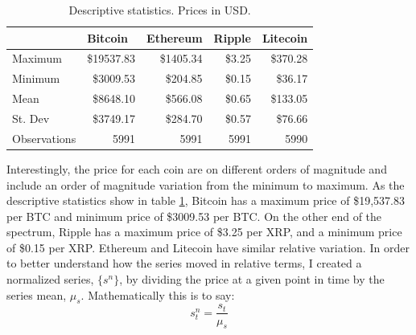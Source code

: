 \documentclass{article}
\begin{document}
	\begin{table}[H]
		\centering
		\begin{tabular}{|l|r|r|r|r|}
			\hline
			& \multicolumn{1}{l|}{Bitcoin} & \multicolumn{1}{l|}{Ethereum} & \multicolumn{1}{l|}{Ripple} & \multicolumn{1}{l|}{Litecoin} \\ \hline
			Maximum      & \$19537.83                     & \$1405.34                       & \$3.25                    & \$370.28                      \\ \hline
			Minimum      & \$3009.53                      & \$204.85                      & \$0.15                    & \$36.17                      \\ \hline
			Mean         & \$8648.10                      & \$566.08                      & \$0.65                    & \$133.05                      \\ \hline
			St. Dev      & \$3749.17                      & \$284.70                      & \$0.57                    & \$76.66                      \\ \hline
			Observations & 5991                         & 5991                          & 5991                        & 5990                          \\ \hline
		\end{tabular}
		\caption{Descriptive statistics. Prices in USD.}
		\label{desStats}
	\end{table}

	Interestingly, the price for each coin are on different orders of magnitude and include an order of magnitude variation from the minimum to maximum. As the descriptive statistics show in table \ref{desStats}, Bitcoin has a maximum price of \$19,537.83 per BTC and minimum price of \$3009.53 per BTC. On the other end of the spectrum, Ripple has a maximum price of \$3.25 per XRP, and a minimum price of \$0.15 per XRP. Ethereum and Litecoin have similar relative variation. In order to better understand how the series moved in relative terms, I created a normalized series, $\{s^n\}$, by dividing the price at a given point in time by the series mean, $\mu_s$. Mathematically this is to say: 
	\begin{equation}
		s_t^n = \frac{s_t}{\mu_s}
	\end{equation}
	
\end{document}
